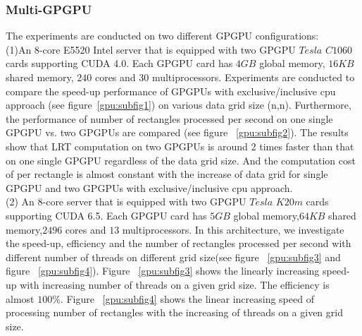 \documentclass[AMA,LATO1COL]{WileyNJD-v2-bak}
\begin{document}
\subsubsection{Multi-GPGPU}
\noindent The experiments are conducted on two different GPGPU configurations:
\\ (1)An 8-core E5520 Intel server that is equipped with two GPGPU $Tesla$ $C1060$ cards supporting CUDA 4.0. Each GPGPU card has $4GB$ global memory, $16KB$ shared memory, $240$
cores and $30$ multiprocessors. Experiments are conducted to compare the speed-up performance of GPGPUs with exclusive/inclusive cpu approach (see figure~\ref{gpu:subfig1}) on various data grid size (n,n). Furthermore, the performance of number of rectangles processed per second on one single GPGPU vs. two GPGPUs are compared (see figure ~\ref{gpu:subfig2}). The results show that LRT computation on two GPGPUs is around 2 times faster than that on one single GPGPU regardless of the data grid size. And the computation cost of per rectangle is almost constant with the increase of data grid for single GPGPU and two GPGPUs with exclusive/inclusive cpu approach.
\\ (2) An 8-core server that is equipped with two GPGPU $Tesla$ $K20m$ cards supporting CUDA 6.5. Each GPGPU card has $5GB$ global memory,$64KB$ shared memory,$2496$ cores and $13$ multiprocessors. In this architecture, we investigate the speed-up, efficiency and the number of rectangles processed per second with different number of threads on different grid size(see figure ~\ref{gpu:subfig3} and figure ~\ref{gpu:subfig4}). Figure ~\ref{gpu:subfig3} shows the linearly increasing speed-up with increasing number of threads on a given grid size. The efficiency is almost $100\%$. Figure ~\ref{gpu:subfig4} shows the linear increasing speed of processing number of rectangles with the increasing of threads on a given grid size.   \\
\end{document}
